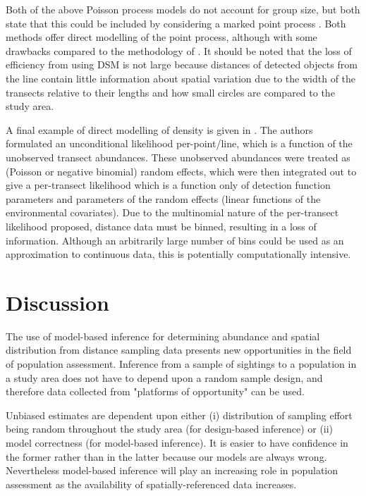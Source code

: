 \documentclass[a4paper,12pt]{article}
\begin{document}
Both of the above Poisson process models do not account for group size, but both state that this could be included by considering a marked point process \citep[Section 5.5]{cox1980point}. Both methods offer direct modelling of the point process, although with some drawbacks compared to the methodology of \cite{Hedley:2004et}. It should be noted that the loss of efficiency from using DSM is not large \citep[p. 313]{Buckland:2004ts} because distances of detected objects from the line contain little information about spatial variation due to the width of the transects relative to their lengths and how small circles are compared to the study area.

A final example of direct modelling of density is given in \cite{Royle:2004tu}. The authors formulated an unconditional likelihood per-point/line, which is a function of the unobserved transect abundances. These unobserved abundances were treated as (Poisson or negative binomial) random effects, which were then integrated out to give a per-transect likelihood which is a function only of detection function parameters and parameters of the random effects (linear functions of the environmental covariates). Due to the multinomial nature of the per-transect likelihood proposed, distance data must be binned, resulting in a loss of information. Although an arbitrarily large number of bins could be used as an approximation to continuous data, this is potentially computationally intensive.


\section*{Discussion}
\label{s:discussion}

The use of model-based inference for determining abundance and spatial distribution from distance sampling data presents new opportunities in the field of population assessment.   Inference from a sample of sightings to a population in a study area does not have to depend upon a random sample design, and therefore data collected from "platforms of opportunity" \citep{Williams:2006tz} can be used.

Unbiased estimates are dependent upon either (i) distribution of sampling effort being random throughout the study area (for design-based inference) or (ii) model correctness (for model-based inference).  It is easier to have confidence in the former rather than in the latter because our models are always wrong. Nevertheless model-based inference will play an increasing role in population assessment as the availability of spatially-referenced data increases.
\end{document}

